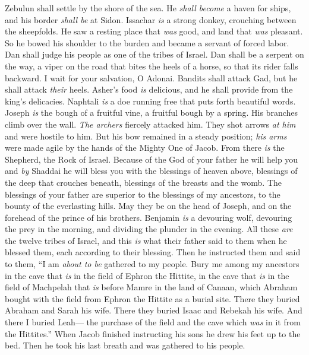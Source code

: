 \begin{biblechapter}
\verse Zebulun shall settle by the shore of the sea. 
He \textit{shall become} a haven for ships, 
and his border \textit{shall be} at Sidon.
\verse Issachar \textit{is} a strong donkey, 
crouching between the sheepfolds.
\verse He saw a resting place that \textit{was} good, 
and land that \textit{was} pleasant. 
So he bowed his shoulder to the burden 
and became a servant of forced labor.
\verse Dan shall judge his people 
as one of the tribes of Israel.
\verse Dan shall be a serpent on the way, 
a viper on the road 
that bites the heels of a horse, 
so that its rider falls backward.
\verse I wait for your salvation, O Adonai.
\verse Bandits shall attack Gad, 
but he shall attack \textit{their} heels.
\verse Asher’s food \textit{is} delicious, 
and he shall provide from the king’s delicacies.
\verse Naphtali \textit{is} a doe running free 
that puts forth beautiful words.
\verse Joseph \textit{is} the bough of a fruitful vine, 
a fruitful bough by a spring. 
His branches climb over the wall.
\verse \textit{The archers} fiercely attacked him. 
They shot arrows \textit{at him} and were hostile to him.
\verse But his bow remained in a steady position; 
\textit{his arms} were made agile 
by the hands of the Mighty One of Jacob. 
From there \textit{is} the Shepherd, the Rock of Israel.
\verse Because of the God of your father he will help you 
and \textit{by} Shaddai he will bless you 
with the blessings of heaven above, 
blessings of the deep that crouches beneath, 
blessings of the breasts and the womb.
\verse The blessings of your father 
are superior to the blessings of my ancestors, 
to the bounty of the everlasting hills. 
May they be on the head of Joseph, 
and on the forehead of the prince of his brothers.
\verse Benjamin \textit{is} a devouring wolf, 
devouring the prey in the morning, 
and dividing the plunder in the evening.
 All these \textit{are} the twelve tribes of Israel, and this \textit{is} what their father said to them when he blessed them, each according to their blessing.
\verse Then he instructed them and said to them, “I am \textit{about to be} gathered to my people. Bury me among my ancestors in the cave that \textit{is} in the field of Ephron the Hittite,
\verse in the cave that \textit{is} in the field of Machpelah that \textit{is} before Mamre in the land of Canaan, which Abraham bought with the field from Ephron the Hittite as a burial site.
\verse There they buried Abraham and Sarah his wife. There they buried Isaac and Rebekah his wife. And there I buried Leah—
\verse the purchase of the field and the cave which \textit{was} in it from the Hittites.”
\verse When Jacob finished instructing his sons he drew his feet up to the bed. Then he took his last breath and was gathered to his people.
\end{biblechapter}

